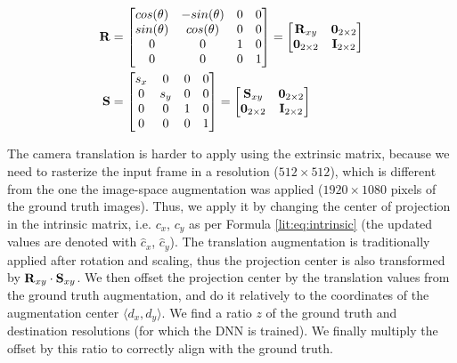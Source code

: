 \begin{align}
	\bmr{R} &= \begin{bmatrix} 
		cos(\theta) & -sin(\theta) & 0 & 0 \\
		sin(\theta) & cos(\theta)  & 0 & 0 \\
		0           & 0            & 1 & 0 \\
		0           & 0            & 0 & 1 \\
	\end{bmatrix} = \begin{bmatrix} 
		\bmr{R}_{xy}         & \bmr{0}_{2 \times 2} \\
		\bmr{0}_{2 \times 2} & \bmr{I}_{2 \times 2} \\
	\end{bmatrix}\\%
	\bmr{S} &= \begin{bmatrix} 
		s_x         & 0            & 0 & 0 \\
		0           & s_y          & 0 & 0 \\
		0           & 0            & 1 & 0 \\
		0           & 0            & 0 & 1 \\
	\end{bmatrix} = \begin{bmatrix} 
		\bmr{S}_{xy}         & \bmr{0}_{2 \times 2} \\
		\bmr{0}_{2 \times 2} & \bmr{I}_{2 \times 2} \\
	\end{bmatrix}\label{methods:eq:cam-aug-scale-rot}
\end{align}

%	
%	

The camera translation is harder to apply using the extrinsic matrix, because we need to rasterize the input frame in a resolution ($512\times512$), which is different from the one the image-space augmentation was applied ($1920\times1080$ pixels of the ground truth images). Thus, we apply it by changing the center of projection in the intrinsic matrix, i.e. $c_x$, $c_y$ as per Formula \ref{lit:eq:intrinsic} (the updated values are denoted with $\hat{c}_x$, $\hat{c}_y$). The translation augmentation is traditionally applied after rotation and scaling, thus the projection center is also transformed by $\bm{\mathrm{R}}_{xy} \cdot \bm{\mathrm{S}}_{xy}$. We then offset the projection center by the translation values from the ground truth augmentation, and do it relatively to the coordinates of the augmentation center $\langle d_x, d_y \rangle$. We find a ratio $z$ of the ground truth and destination resolutions (for which the DNN is trained). We finally multiply the offset by this ratio to correctly align with the ground truth.
 
